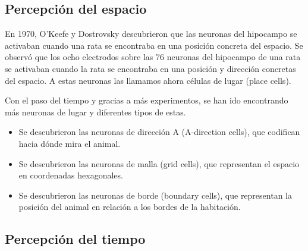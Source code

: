 \documentclass[12pt, letterpaper]{article}
\begin{document}
\subsection{Percepción del espacio}
En 1970, O'Keefe y Dostrovsky descubrieron que las neuronas del hipocampo se activaban cuando una rata se encontraba en una posición concreta del espacio. Se observó que los ocho electrodos sobre las 76 neuronas del hipocampo de una rata se activaban cuando la rata se encontraba en una posición y dirección concretas del espacio. A estas neuronas las llamamos ahora células de lugar (place cells). 

Con el paso del tiempo y gracias a más experimentos, se han ido encontrando más neuronas de lugar y diferentes tipos de estas. 
\begin{itemize}
    \item Se descubrieron las neuronas de dirección A (A-direction cells), que codifican hacia dónde mira el animal.
    \item Se descubrieron las neuronas de malla (grid cells), que representan el espacio en coordenadas hexagonales.
    \item Se descubrieron las neuronas de borde (boundary cells), que representan la posición del animal en relación a los bordes de la habitación.
\end{itemize}

\subsection{Percepción del tiempo}
\end{document}
